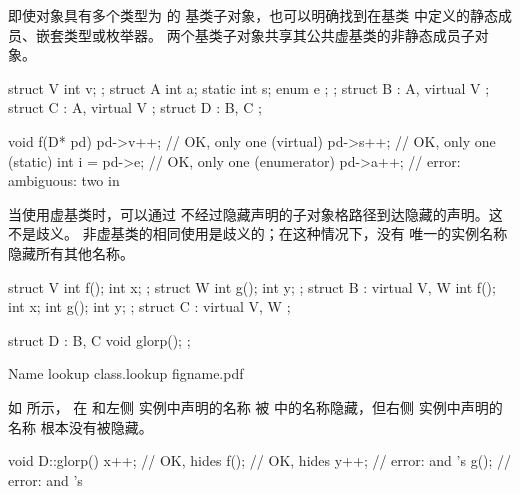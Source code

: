 \pnum
\begin{note}
即使对象具有多个类型为  的
基类子对象，也可以明确找到在基类  中定义的静态成员、嵌套类型或枚举器。
两个基类子对象共享其公共虚基类的非静态成员子对象。
\end{note}
\begin{example}
\begin{codeblock}
struct V {
  int v;
};
struct A {
  int a;
  static int s;
  enum { e };
};
struct B : A, virtual V { };
struct C : A, virtual V { };
struct D : B, C { };

void f(D* pd) {
  pd->v++;          // OK, only one  (virtual)
  pd->s++;          // OK, only one  (static)
  int i = pd->e;    // OK, only one  (enumerator)
  pd->a++;          // error: ambiguous: two  in 
}
\end{codeblock}
\end{example}

\pnum
\begin{note}
%
当使用虚基类时，可以通过
不经过隐藏声明的子对象格路径到达隐藏的声明。这不是歧义。
非虚基类的相同使用是歧义的；在这种情况下，没有
唯一的实例名称隐藏所有其他名称。
\end{note}
\begin{example}
\begin{codeblock}
struct V { int f();  int x; };
struct W { int g();  int y; };
struct B : virtual V, W {
  int f();  int x;
  int g();  int y;
};
struct C : virtual V, W { };

struct D : B, C { void glorp(); };
\end{codeblock}

\begin{importgraphic}
{Name lookup}
{class.lookup}
{figname.pdf}
\end{importgraphic}

如  所示，
在  和左侧  实例中声明的名称
被  中的名称隐藏，但右侧  实例中声明的名称
根本没有被隐藏。
\begin{codeblock}
void D::glorp() {
  x++;              // OK,  hides 
  f();              // OK,  hides 
  y++;              // error:  and 's 
  g();              // error:  and 's 
}
\end{codeblock}
\end{example}
%

